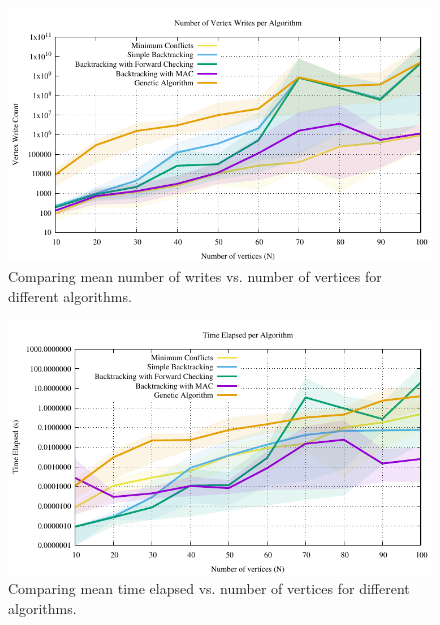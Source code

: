 \documentclass{article}
\begin{document}
\begin{multicols}{2}
\begin{figure}[H]
	\centering
	\includegraphics[width=\linewidth]{../results/comparing_write_performance}
	\caption{Comparing mean number of writes vs. number of vertices for different algorithms.}
\end{figure}

\begin{figure}[H]
	\centering
	\includegraphics[width=\linewidth]{../results/comparing_time_performance}
	\caption{Comparing mean time elapsed vs. number of vertices for different algorithms.}
\end{figure}


\end{multicols}
\end{document}
